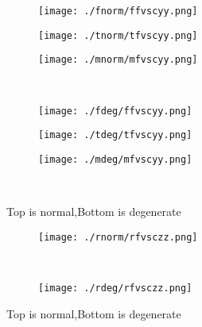 \documentclass[aps,floats,floatfix,nofootinbib]{revtex4-1}
\begin{document}
\begin{center}
\begin{figure}
\begin{subfigure}{0.3\textwidth}
\texttt{[image: ./fnorm/ffvscyy.png]}
\label{}
\end{subfigure}
\begin{subfigure}{0.3\textwidth}
\texttt{[image: ./tnorm/tfvscyy.png]}
\label{}
\end{subfigure}
\begin{subfigure}{0.3\textwidth}
\texttt{[image: ./mnorm/mfvscyy.png]}
\label{}
\end{subfigure}\\
\begin{subfigure}{0.3\textwidth}
\texttt{[image: ./fdeg/ffvscyy.png]}
\label{}
\end{subfigure}
\begin{subfigure}{0.3\textwidth}
\texttt{[image: ./tdeg/tfvscyy.png]}
\label{}
\end{subfigure}
\begin{subfigure}{0.3\textwidth}
\texttt{[image: ./mdeg/mfvscyy.png]}
\label{}
\end{subfigure}\\
\caption{Top is normal,Bottom is degenerate}
\end{figure}
\end{center}

\begin{center}
\begin{figure}
\begin{subfigure}{0.95\textwidth}
\texttt{[image: ./rnorm/rfvsczz.png]}
\label{}
\end{subfigure}\\
\begin{subfigure}{0.95\textwidth}
\texttt{[image: ./rdeg/rfvsczz.png]}
\label{}
\end{subfigure}
\caption{Top is normal,Bottom is degenerate}
\end{figure}
\end{center}
\end{document}
